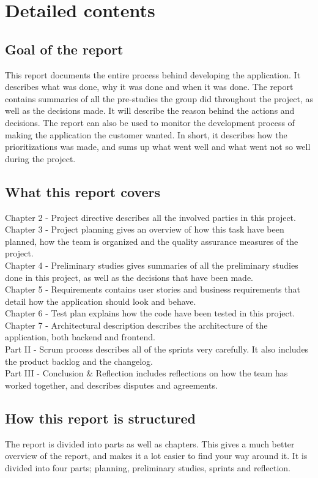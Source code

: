 \chapter*{Detailed contents}

\section*{Goal of the report}
This report documents the entire process behind developing the application. It describes what was done, why it was done and when it was done. The report contains summaries of all the pre-studies the group did throughout the project, as well as the decisions made. It will describe the reason behind the actions and decisions. The report can also be used to monitor the development process of making the application the customer wanted. In short, it describes how the prioritizations was made, and sums up what went well and what went not so well during the project.

\section*{What this report covers}
Chapter 2 - Project directive describes all the involved parties in this project. \\ 
Chapter 3 - Project planning gives an overview of how this task have been planned, how the team
\hspace*{5.5em}is organized and the quality assurance measures of the project. \\
Chapter 4 - Preliminary studies gives summaries of all the preliminary studies done in this project,
\hspace*{5.5em}as well as the decisions that have been made. \\
Chapter 5 - Requirements contains user stories and business requirements that detail how the
\hspace*{5.5em}application should look and behave. \\ 
Chapter 6 - Test plan explains how the code have been tested in this project. \\
Chapter 7 - Architectural description describes the architecture of the application, both backend
\hspace*{5.5em}and frontend. \\
Part II - Scrum process describes all of the sprints very carefully. It also includes the product
\hspace*{4.5em}backlog and the changelog. \\
Part III - Conclusion \& Reflection includes reflections on how the team has worked together, and
\hspace*{4.5em}describes disputes and agreements.

\section*{How this report is structured}
The report is divided into parts as well as chapters. This gives a much better overview of the report, and makes it a lot easier to find your way around it. It is divided into four parts; planning, preliminary studies, sprints and reflection.